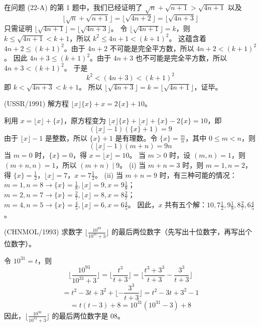 \begin{questions}
\begin{solution}
在问题 (22-A) 的第 1 题中，我们已经证明了 $\sqrt{n} + \sqrt{n + 1} > \sqrt{4n + 1}$ 以及
\[
\lfloor \sqrt{n} + \sqrt{n + 1} \rfloor = \lfloor \sqrt{4n + 2} \rfloor = \lfloor \sqrt{4n + 3} \rfloor
\]
只需证明 $\lfloor \sqrt{4n + 1} \rfloor = \lfloor \sqrt{4n + 3} \rfloor$。
令 $\lfloor \sqrt{4n + 1} \rfloor = k$，则 $k \le \sqrt{4n + 1} < k + 1$，所以 $k^2 \le 4n + 1 < (k + 1)^2$。
这蕴含着 $4n + 2 \le (k + 1)^2$。由于 $4n + 2$ 不可能是完全平方数，所以 $4n + 2 < (k + 1)^2$。
因此 $4n + 3 \le (k + 1)^2$。由于 $4n + 3$ 也不可能是完全平方数，所以 $4n + 3 < (k + 1)^2$。
于是
\[
k^2 < (4n + 3) < (k + 1)^2
\]
即 $k < \sqrt{4n + 3} < k + 1$。
所以 $\lfloor \sqrt{4n + 3} \rfloor = k = \lfloor \sqrt{4n + 1} \rfloor$，证毕。
\end{solution}

\question (USSR/1991) 解方程 $\lfloor x \rfloor \{x\} + x = 2\{x\} + 10$。

\begin{solution}
利用 $x = \lfloor x \rfloor + \{x\}$，原方程变为 $\lfloor x \rfloor \{x\} + \lfloor x \rfloor + \{x\} - 2\{x\} = 10$，即
\[
(\lfloor x \rfloor - 1)(\{x\} + 1) = 9
\]
由于 $\lfloor x \rfloor - 1$ 是整数，所以 $\{x\} + 1$ 是有理数。令 $\{x\} = \frac{m}{n}$，其中 $0 \le m < n$，则
\[
(\lfloor x \rfloor - 1)(m + n) = 9n
\]
当 $m = 0$ 时，$\{x\} = 0$，得 $x = \lfloor x \rfloor = 10$。
当 $m > 0$ 时，设 $(m, n) = 1$，则 $(m + n, n) = 1$，所以 $(m + n) \mid 9$。
(i) 当 $m + n = 3$ 时，则 $m = 1, n = 2$，得 $\{x\} = \frac{1}{2}$，$\lfloor x \rfloor = 7$，$x = 7\frac{1}{2}$。
(ii) 当 $m + n = 9$ 时，有三种可能的情况：
$m = 1, n = 8 \to \{x\} = \frac{1}{8}, \lfloor x \rfloor = 9, x = 9\frac{1}{8}$；
$m = 2, n = 7 \to \{x\} = \frac{2}{7}, \lfloor x \rfloor = 8, x = 8\frac{2}{7}$；
$m = 4, n = 5 \to \{x\} = \frac{4}{5}, \lfloor x \rfloor = 6, x = 6\frac{4}{5}$。
因此，$x$ 共有五个解：$10, 7\frac{1}{2}, 9\frac{1}{8}, 8\frac{2}{7}, 6\frac{4}{5}$。
\end{solution}

\question (CHNMOL/1993) 求数字 $\lfloor \frac{10^{93}}{10^{31} + 3} \rfloor$ 的最后两位数字（先写出十位数字，再写出个位数字）。

\begin{solution}
令 $10^{31} = t$，则
\[
\lfloor \frac{10^{93}}{10^{31} + 3} \rfloor = \lfloor \frac{t^3}{t + 3} \rfloor = \lfloor \frac{t^3 + 3^3}{t + 3} - \frac{3^3}{t + 3} \rfloor
\]
\[
= t^2 - 3t + 3^2 + \lfloor -\frac{3^3}{t + 3} \rfloor = t^2 - 3t + 3^2 - 1
\]
\[
= t(t - 3) + 8 = 10^{31}(10^{31} - 3) + 8
\]
因此，$\lfloor \frac{10^{93}}{10^{31} + 3} \rfloor$ 的最后两位数字是 $08$。
\end{solution}


\end{questions}
